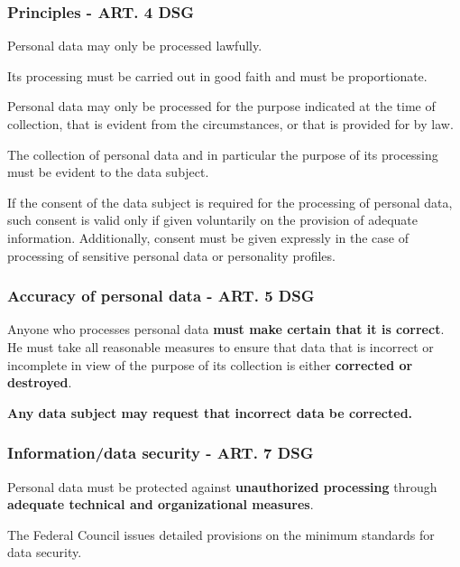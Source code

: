 \subsubsection{Principles - ART. 4 DSG}
\begin{compactenum}	
	\item Personal data may only be processed lawfully.
	\item Its processing must be carried out in good faith and must be proportionate.
	\item Personal data may only be processed for the purpose indicated at the time of collection, that is evident from the circumstances, or that is provided for by law.
	\item The collection of personal data and in particular the purpose of its processing must	be evident to the data subject.
	\item If the consent of the data subject is required for the processing of personal data, such consent is valid only if given voluntarily on the provision of adequate information. Additionally, consent must be given expressly in the case of processing of sensitive personal data or personality profiles.
\end{compactenum}

\subsubsection{Accuracy of personal data - ART. 5 DSG}
\begin{compactenum}	
	\item Anyone who processes personal data \textbf{must make certain that it is correct}. He must take all reasonable measures to ensure that data that is incorrect or incomplete in view of the purpose of its collection is either \textbf{corrected or destroyed}.
	\item \textbf{Any data subject may request that incorrect data be corrected.}
\end{compactenum}

\subsubsection{Information/data security - ART. 7 DSG}
\begin{compactenum}	
	\item Personal data must be protected against \textbf{unauthorized processing} through \textbf{adequate technical and organizational measures}.
	\item The Federal Council issues detailed provisions on the	minimum standards for data security.
\end{compactenum}

